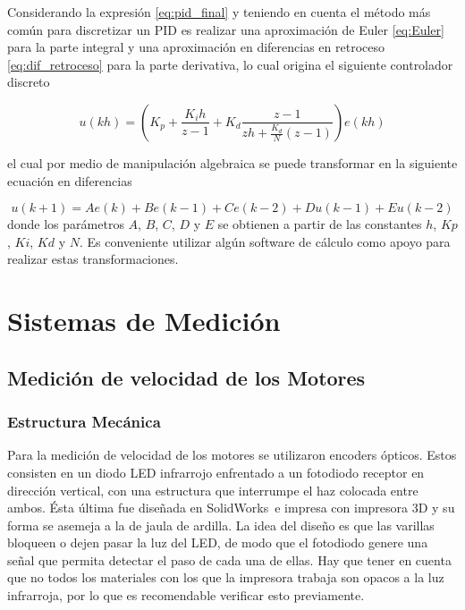 \documentclass[10pt,conference,a4paper,onecolumn]{article}%
\begin{document}
Considerando la expresión \ref{eq:pid_final} y teniendo en cuenta \cite[pág. 219]{astrom} el método más común para discretizar un PID es realizar una aproximación de Euler \ref{eq:Euler} para la parte integral y una aproximación en diferencias en retroceso \ref{eq:dif_retroceso} para la parte derivativa, lo cual origina el siguiente controlador discreto

\begin{equation}
  u(kh)=\left(K_p + \frac{K_ih}{z-1} + K_d\frac{z-1}{zh+\frac{K_d}{N}(z-1)}	  \right) e(kh)
\end{equation}  

el cual por medio de manipulación algebraica se puede transformar en la siguiente ecuación en diferencias

\begin{equation}
u(k+1)=Ae(k)+Be(k-1)+Ce(k-2)+Du(k-1)+Eu(k-2)
\end{equation} 
donde los parámetros $A$, $B$, $C$, $D$ y $E$ se obtienen a partir de las constantes $h$, $Kp$, $Ki$, $Kd$ y $N$. Es conveniente utilizar algún software de cálculo como apoyo para realizar estas transformaciones.
\section{Sistemas de Medición}
\label{sec:sist_de_medicion}
\subsection{Medición de velocidad de los Motores}
\subsubsection{Estructura Mecánica}
Para la medición de velocidad de los motores se utilizaron encoders ópticos. Estos consisten en un diodo LED infrarrojo enfrentado a un fotodiodo receptor en dirección vertical, con una estructura que interrumpe el haz colocada entre ambos. Ésta última fue diseñada en SolidWorks\textregistered \ e impresa con impresora 3D y su forma se asemeja a la de jaula de ardilla. La idea del diseño es que las varillas bloqueen o dejen pasar la luz del LED, de modo que el fotodiodo genere una señal que permita detectar el paso de cada una de ellas. Hay que tener en cuenta que no todos los materiales con los que la impresora trabaja son opacos a la luz infrarroja, por lo que es recomendable verificar esto previamente.
\\
\end{document}
